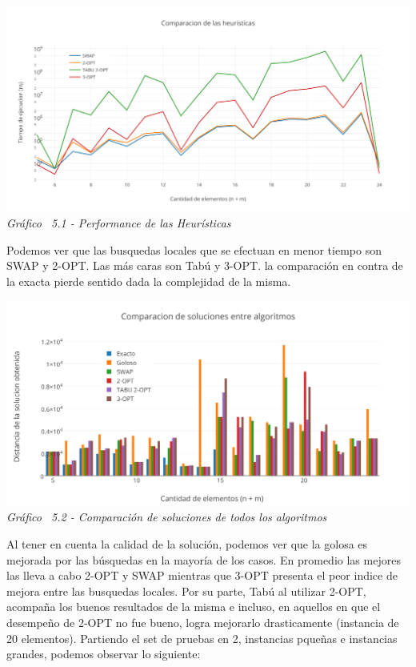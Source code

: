 \vspace*{0.3cm} \vspace*{0.3cm}
  \begin{center}
 \includegraphics[scale=0.5]{./EJ5/medicion.png}\\
 {\textit{Gráfico \ 5.1 - Performance de las Heur\'isticas}}
  \end{center}
  \vspace*{0.3cm}


Podemos ver que las busquedas locales que se efectuan en menor tiempo son SWAP y 2-OPT. Las más caras son Tabú y 3-OPT. la comparación en contra de la exacta pierde sentido dada la complejidad de la misma.


\vspace*{0.3cm} \vspace*{0.3cm}
  \begin{center}
 \includegraphics[scale=0.5]{./EJ5/comparativo.png}\\
 {\textit{Gráfico \ 5.2 - Comparaci\'on de soluciones de todos los algoritmos}}
  \end{center}
  \vspace*{0.3cm}
  
  


Al tener en cuenta la calidad de la solución, podemos ver que la golosa es mejorada por las búsquedas en la mayoría de los casos. En promedio las mejores las lleva a cabo 2-OPT y SWAP mientras que 3-OPT presenta el peor indice de mejora entre las busquedas locales. Por su parte, Tabú al utilizar 2-OPT, acompaña los buenos resultados de la misma e incluso, en aquellos en que el desempeño de 2-OPT no fue bueno, logra mejorarlo drasticamente (instancia de 20 elementos).
Partiendo el set de pruebas en 2, instancias pqueñas e instancias grandes, podemos observar lo siguiente:

